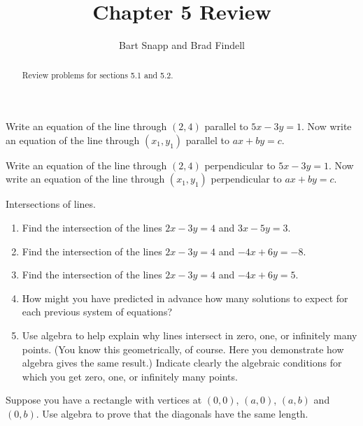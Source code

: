 \documentclass[nooutcomes]{ximera}
\title{Chapter 5 Review}
\author{Bart Snapp and Brad Findell}
\begin{document}
\begin{abstract}
Review problems for sections 5.1 and 5.2.
\end{abstract}
\maketitle




\begin{problem}
Write an equation of the line through $(2,4)$ parallel to $5x-3y=1$.  
Now write an equation of the line through $(x_1,y_1)$ parallel to $ax+by=c$. 
\end{problem}

\begin{problem}
Write an equation of the line through $(2,4)$ perpendicular to $5x-3y=1$.  
Now write an equation of the line through $(x_1,y_1)$ perpendicular to $ax+by=c$. 
\end{problem}

\begin{problem}
Intersections of lines.  
\begin{enumerate}
\item Find the intersection of the lines $2x-3y=4$ and $3x-5y=3$.  
\item Find the intersection of the lines $2x-3y=4$ and $-4x+6y=-8$.
\item Find the intersection of the lines $2x-3y=4$ and $-4x+6y=5$.
\item How might you have predicted in advance how many solutions to expect for each previous system of equations?
\item Use algebra to help explain why lines intersect in zero, one, or infinitely many points.  (You know this geometrically, of course.  Here you demonstrate how algebra gives the same result.)  Indicate clearly the algebraic conditions
for which you get zero, one, or infinitely many points.  
\end{enumerate}
\end{problem}

\begin{problem}
Suppose you have a rectangle with vertices at $(0,0)$, $(a,0)$,
$(a,b)$ and $(0,b)$. Use algebra to prove that the diagonals have the
same length.
\end{problem}
\end{document}
